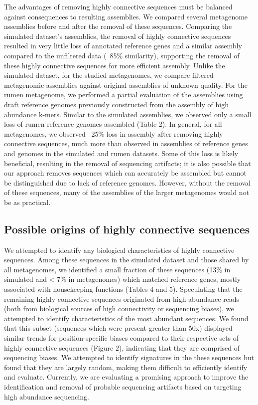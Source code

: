 \documentclass[10pt]{article}
\begin{document}
The advantages of removing highly connective sequences must be balanced against consequences to resulting assemblies.  We compared several metagenome assemblies before and after the removal of these sequences.   Comparing the simulated dataset's assemblies, the removal of highly connective sequences resulted in very little loss of annotated reference genes and a similar assembly compared to the unfiltered data (~85\% similarity), supporting the removal of these highly connective sequences for more efficient assembly.  Unlike the simulated dataset, for the studied metagenomes, we compare filtered metagenomic assemblies against original assemblies of unknown quality.  For the rumen metagenome, we performed a partial evaluation of the assemblies using draft reference genomes previously constructed from the assembly of high abundance k-mers.   Similar to the simulated assemblies, we observed only a small loss of rumen reference genomes assembled (Table 2).  In general, for all metagenomes, we observed ~25\% loss in assembly after removing highly connective sequences, much more than observed in assemblies of reference genes and genomes in the simulated and rumen datasets.  Some of this loss is likely beneficial, resulting in the removal of sequencing artifacts; it is also possible that our approach removes sequences which can accurately be assembled but cannot be distinguished due to lack of reference genomes.  However, without the removal of these sequences, many of the assemblies of the larger metagenomes would not be as practical.  

\subsection*{Possible origins of highly connective sequences}

We attempted to identify any biological characteristics of highly connective sequences.  Among these sequences in the simulated dataset and those shared by all metagenomes, we identified a small fraction of these sequences (13\% in simulated and < 7\% in metagenomes) which matched reference genes, mostly associated with housekeeping functions (Tables 4 and 5).  Speculating that the remaining highly connective sequences originated from high abundance reads (both from biological sources of high connectivity or sequencing biases), we attempted to identify characteristics of the most abundant sequences.  We found that this subset (sequences which were present greater than 50x) displayed similar trends for position-specific biases compared to their respective sets of highly connective sequences (Figure 2), indicating that they are comprised of sequencing biases.  We attempted to identify signatures in the these sequences but found that they are largely random, making them difficult to efficiently identify and evaluate.  Currently, we are evaluating a promising approach to improve the identification and removal of probable sequencing artifacts based on targeting high abundance sequencing. 
\end{document}
